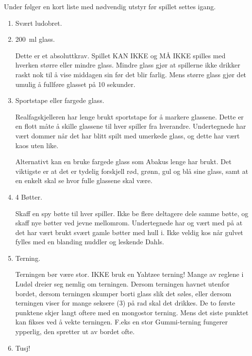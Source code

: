 \documentclass[10pt,a4paper,norsk,openany]{book}
\begin{document}
Under følger en kort liste med nødvendig utstyr før spillet settes igang.

\begin{enumerate}

  \item Svært ludobret.

  \item \SI{200}{\ml} glass.

    Dette er et absoluttkrav. Spillet KAN IKKE og MÅ IKKE spilles med hverken større
    eller mindre glass. Mindre glass gjør at spillerne ikke drikker raskt nok til å
    vise middagen sin før det blir farlig. Mens større glass gjør det umulig å
    fullføre glasset på 10 sekunder.

  \item Sportstape eller fargede glass.

    Realfagskjelleren har lenge brukt sportstape for å markere glassene. Dette er en
    flott måte å skille glassene til hver spiller fra hverandre. Undertegnede har
    vært dommer når det har blitt spilt med umerkede glass, og dette har vært kaos
    uten like.

    Alternativt kan en bruke fargede glass som Abakus lenge har brukt. Det viktigste
    er at det er tydelig forskjell rød, grønn, gul og blå sine glass, samt at en
    enkelt skal se hvor fulle glassene skal være.

  \item 4 Bøtter.

    Skaff en spy bøtte til hver spiller. Ikke be flere deltagere dele samme bøtte,
    og skaff nye bøtter ved jevne mellomrom. Undertegnede har og vært med på at det
    har vært brukt svært gamle bøtter med hull i. Ikke veldig kos når gulvet fylles
    med en blanding nuddler og leskende Dahls.

  \item Terning.

    Terningen bør være stor. IKKE bruk en Yahtzee terning! Mange av reglene i Ludøl
    dreier seg nemlig om terningen. Dersom terningen havnet utenfor bordet, dersom
    terningen skumper borti glass slik det søles, eller dersom terningen
    viser for mange seksere (3) på rad skal det drikkes. De to første punktene skjer
    langt oftere med en mongostor terning. Mens det siste punktet kan fikses ved å
    vekte terningen. F.eks en stor Gummi-terning fungerer ypperlig, den spretter ut
    av bordet ofte.

  \item Tusj!


\end{enumerate}
\end{document}
